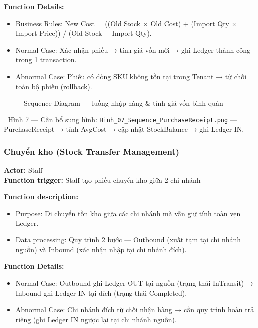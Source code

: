 \textbf{Function Details:}
\begin{itemize}
    \item Business Rules: New Cost = ((Old Stock × Old Cost) + (Import Qty × Import Price)) / (Old Stock + Import Qty).
    \item Normal Case: Xác nhận phiếu → tính giá vốn mới → ghi Ledger thành công trong 1 transaction.
    \item Abnormal Case: Phiếu có dòng SKU không tồn tại trong Tenant → từ chối toàn bộ phiếu (rollback).
\end{itemize}

\begin{figure}[H]
    \centering
    \caption{Sequence Diagram — luồng nhập hàng \& tính giá vốn bình quân}
    \label{fig:seq-purchase-receipt}
\end{figure}
\begin{imgnote}
📌 Hình 7 — Cần bổ sung hình: \texttt{Hinh\_07\_Sequence\_PurchaseReceipt.png} — PurchaseReceipt → tính AvgCost → cập nhật StockBalance → ghi Ledger IN.
\end{imgnote}

\subsubsection{Chuyển kho (Stock Transfer Management)}
\textbf{Actor:} Staff \\
\textbf{Function trigger:} Staff tạo phiếu chuyển kho giữa 2 chi nhánh

\textbf{Function description:}
\begin{itemize}
    \item Purpose: Di chuyển tồn kho giữa các chi nhánh mà vẫn giữ tính toàn vẹn Ledger.
    \item Data processing: Quy trình 2 bước — Outbound (xuất tạm tại chi nhánh nguồn) và Inbound (xác nhận nhập tại chi nhánh đích).
\end{itemize}

\textbf{Function Details:}
\begin{itemize}
    \item Normal Case: Outbound ghi Ledger OUT tại nguồn (trạng thái InTransit) → Inbound ghi Ledger IN tại đích (trạng thái Completed).
    \item Abnormal Case: Chi nhánh đích từ chối nhận hàng → cần quy trình hoàn trả riêng (ghi Ledger IN ngược lại tại chi nhánh nguồn).
\end{itemize}

